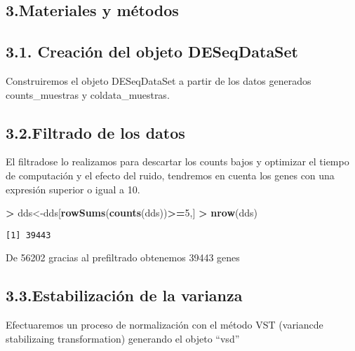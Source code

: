 \documentclass[
]{article}
\newenvironment{Shaded}{\begin{snugshade}}{\end{snugshade}}
\newcommand{\DecValTok}[1]{\textcolor[rgb]{0.00,0.00,0.81}{#1}}
\newcommand{\KeywordTok}[1]{\textcolor[rgb]{0.13,0.29,0.53}{\textbf{#1}}}
\newcommand{\NormalTok}[1]{#1}
\newcommand{\OperatorTok}[1]{\textcolor[rgb]{0.81,0.36,0.00}{\textbf{#1}}}
\newcommand{\StringTok}[1]{\textcolor[rgb]{0.31,0.60,0.02}{#1}}
\begin{document}
\hypertarget{materiales-y-muxe9todos}{%
\subsection{3.Materiales y métodos}\label{materiales-y-muxe9todos}}

\hypertarget{creaciuxf3n-del-objeto-deseqdataset}{%
\subsection{3.1. Creación del objeto
DESeqDataSet}\label{creaciuxf3n-del-objeto-deseqdataset}}

Construiremos el objeto DESeqDataSet a partir de los datos generados
counts\_muestras y coldata\_muestras.

\hypertarget{filtrado-de-los-datos}{%
\subsection{3.2.Filtrado de los datos}\label{filtrado-de-los-datos}}

El filtradose lo realizamos para descartar los counts bajos y optimizar
el tiempo de computación y el efecto del ruido, tendremos en cuenta los
genes con una expresión superior o igual a 10.

\begin{Shaded}
\begin{Highlighting}[]
\OperatorTok{>}\StringTok{ }\NormalTok{dds<-dds[}\KeywordTok{rowSums}\NormalTok{(}\KeywordTok{counts}\NormalTok{(dds))}\OperatorTok{>=}\DecValTok{5}\NormalTok{,]}
\OperatorTok{>}\StringTok{ }\KeywordTok{nrow}\NormalTok{(dds)}
\end{Highlighting}
\end{Shaded}

\begin{verbatim}
[1] 39443
\end{verbatim}

De 56202 gracias al prefiltrado obtenemos 39443 genes

\hypertarget{estabilizaciuxf3n-de-la-varianza}{%
\subsection{3.3.Estabilización de la
varianza}\label{estabilizaciuxf3n-de-la-varianza}}

Efectuaremos un proceso de normalización con el método VST (variancde
stabilizaing transformation) generando el objeto ``vsd''
\end{document}
